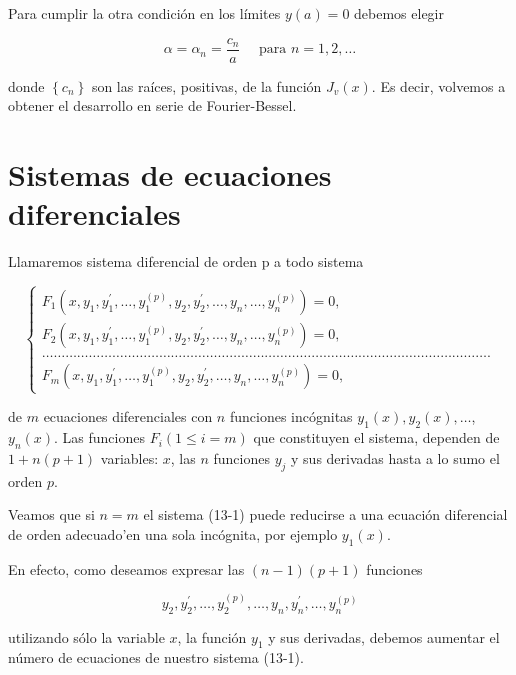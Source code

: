 \documentclass[10pt]{article}
\theoremstyle{plain}
\theoremstyle{definition}
\theoremstyle{remark}
\begin{document}
Para cumplir la otra condición en los límites $y(a)=0$ debemos elegir

$$
\alpha=\alpha_{n}=\frac{c_{n}}{a} \quad \text { para } n=1,2, \ldots
$$

donde $\left\{c_{n}\right\}$ son las raíces, positivas, de la función $J_{v}(x)$. Es decir, volvemos a obtener el desarrollo en serie de Fourier-Bessel.

\section{Sistemas de ecuaciones diferenciales}
Llamaremos sistema diferencial de orden p a todo sistema

\[
\left\{\begin{array}{l}
F_{1}\left(x, y_{1}, y_{1}^{\prime}, \ldots, y_{1}^{(p)}, y_{2}, y_{2}^{\prime}, \ldots, y_{n}, \ldots, y_{n}^{(p)}\right)=0,  \tag{13-1}\\
F_{2}\left(x, y_{1}, y_{1}^{\prime}, \ldots, y_{1}^{(p)}, y_{2}, y_{2}^{\prime}, \ldots, y_{n}, \ldots, y_{n}^{(p)}\right)=0, \\
\ldots \ldots \ldots \ldots \ldots \ldots \ldots \ldots \ldots \ldots \ldots \ldots \ldots \ldots \ldots \ldots \ldots \ldots \ldots \ldots \ldots \ldots \ldots \ldots \ldots \ldots \ldots \ldots \ldots \ldots \ldots \ldots \ldots \ldots \ldots \ldots \ldots \ldots . \\
F_{m}\left(x, y_{1}, y_{1}^{\prime}, \ldots, y_{1}^{(p)}, y_{2}, y_{2}^{\prime}, \ldots, y_{n}, \ldots, y_{n}^{(p)}\right)=0,
\end{array}\right.
\]

de $m$ ecuaciones diferenciales con $n$ funciones incógnitas $y_{1}(x), y_{2}(x), \ldots$, $y_{n}(x)$. Las funciones $F_{i}(1 \leqslant i=m)$ que constituyen el sistema, dependen de $1+n(p+1)$ variables: $x$, las $n$ funciones $y_{j}$ y sus derivadas hasta a lo sumo el orden $p$.

Veamos que si $n=m$ el sistema (13-1) puede reducirse a una ecuación diferencial de orden adecuado'en una sola incógnita, por ejemplo $y_{1}(x)$.

En efecto, como deseamos expresar las $(n-1)(p+1)$ funciones


\begin{equation*}
y_{2}, y_{2}^{\prime}, \ldots, y_{2}^{(p)}, \ldots, y_{n}, y_{n}^{\prime}, \ldots, y_{n}^{(p)} \tag{13-2}
\end{equation*}


utilizando sólo la variable $x$, la función $y_{1}$ y sus derivadas, debemos aumentar el número de ecuaciones de nuestro sistema (13-1).
\end{document}
